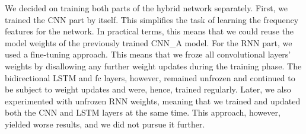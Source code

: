 We decided on training both parts of the hybrid network separately. First, we trained the CNN part by itself. This simplifies the task of learning the frequency features for the network. In practical terms, this means that we could reuse the model weights of the previously trained CNN\_A model. For the RNN part, we used a fine-tuning approach. This means that we froze all convolutional layers' weights by disallowing any further weight updates during the training phase. The bidirectional LSTM and \ac{fc} layers, however, remained unfrozen and continued to be subject to weight updates and were, hence, trained regularly. Later, we also experimented with unfrozen RNN weights, meaning that we trained and updated both the CNN and LSTM layers at the same time. This approach, however, yielded worse results, and we did not pursue it further.

